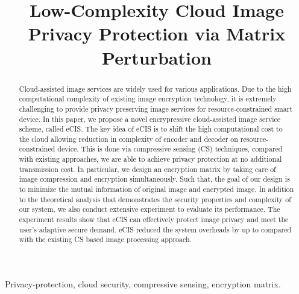 \documentclass[conference]{IEEEtran}
\begin{document}
\title{Low-Complexity Cloud Image Privacy Protection via Matrix Perturbation}


\author{
}

\maketitle

\begin{abstract}
Cloud-assisted image services are widely used for various applications. Due to the high computational complexity of existing image encryption technology, it is extremely challenging to provide privacy preserving image services for resource-constrained smart device. In this paper, we propose a novel encrypressive cloud-assisted image service scheme, called eCIS.  The key idea of eCIS is to shift the high computational cost to the cloud allowing reduction in complexity of encoder and decoder on resource-constrained device. This is done via compressive sensing (CS) techniques, compared with existing approaches, we are able to achieve privacy protection at no additional transmission cost. In particular, we design an encryption matrix  by taking care of  image compression and encryption simultaneously. Such that, the goal of our design is to minimize the mutual information of original image and encrypted image. In addition to the theoretical analysis that demonstrates the security properties and complexity of our system, we also conduct extensive experiment to evaluate its performance. The experiment results show that eCIS  can effectively  protect image privacy and meet the user's adaptive secure demand. eCIS reduced the system overheads by up to   compared with the existing CS based image processing approach.
\end{abstract}

\begin{keywords}
Privacy-protection, cloud security, compressive sensing, encryption matrix.
\end{keywords}
\end{document}
